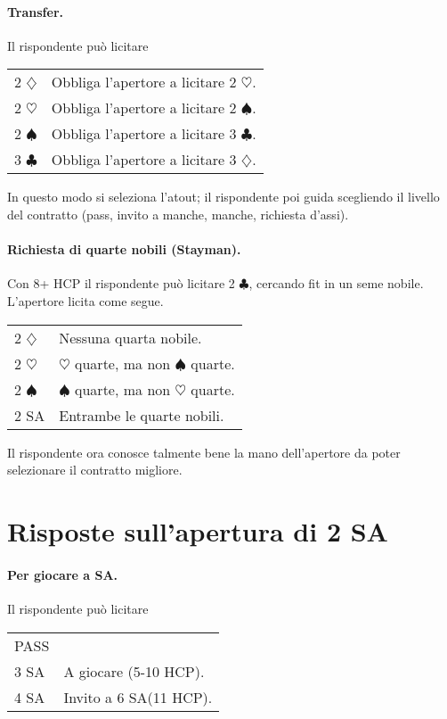 \documentclass[a4paper,10pt]{article}
\renewcommand{\c}{$\clubsuit$\xspace}
\renewcommand{\d}{$\diamondsuit$\xspace}
\newcommand{\h}{$\heartsuit$\xspace}
\newcommand{\s}{$\spadesuit$\xspace}
\newcommand{\sa}{SA\xspace}
\newcommand{\smallspace}{\vskip0.3cm}
\newenvironment{twocol}
  {\smallspace\noindent\begin{tabular}{l p{0.78\textwidth}}}
  {\end{tabular}\smallspace}
\begin{document}
\paragraph{Transfer.} Il rispondente può licitare

\begin{twocol}
 2 \d & Obbliga l'apertore a licitare 2 \h.\\
 2 \h & Obbliga l'apertore a licitare 2 \s.\\
 2 \s & Obbliga l'apertore a licitare 3 \c.\\
 3 \c & Obbliga l'apertore a licitare 3 \d.\\
\end{twocol}

In questo modo si seleziona l'atout; il rispondente poi guida scegliendo il livello del contratto (pass, invito a manche, manche, richiesta d'assi).

\paragraph{Richiesta di quarte nobili (Stayman).} Con 8+ HCP il rispondente può licitare 2 \c, cercando fit in un seme nobile. L'apertore licita come segue.

\begin{twocol}
 2 \d & Nessuna quarta nobile.\\
 2 \h & \h quarte, ma non \s quarte.\\
 2 \s & \s quarte, ma non \h quarte.\\
 2 SA & Entrambe le quarte nobili.
\end{twocol}

Il rispondente ora conosce talmente bene la mano dell'apertore da poter selezionare il contratto migliore.

\section{Risposte sull'apertura di 2 \sa}

\paragraph{Per giocare a \sa.} Il rispondente può licitare

\begin{twocol}
 PASS & \\
 3 \sa & A giocare (5-10 HCP).\\
 4 \sa & Invito a 6 \sa (11 HCP).
\end{twocol}
\end{document}
